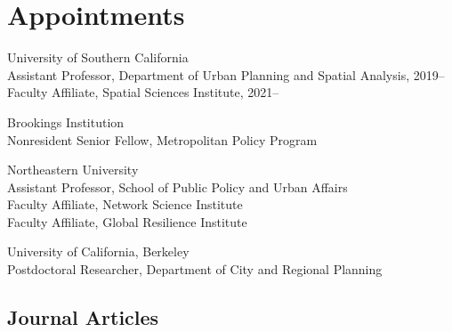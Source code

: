     \section*{Appointments}

    \begin{tablist}

        \item[2019--]   \tab{}University of Southern California \\
                              Assistant Professor, Department of Urban Planning and Spatial Analysis, 2019-- \\
                              Faculty Affiliate, Spatial Sciences Institute, 2021--

        \item[2021--]   \tab{}Brookings Institution \\
                              Nonresident Senior Fellow, Metropolitan Policy Program \\

        \item[2018--19] \tab{}Northeastern University \\
                              Assistant Professor, School of Public Policy and Urban Affairs \\
                              Faculty Affiliate, Network Science Institute \\
                              Faculty Affiliate, Global Resilience Institute

        \item[2017--18] \tab{}University of California, Berkeley \\
                              Postdoctoral Researcher, Department of City and Regional Planning

    \end{tablist}


 \subsection*{Journal Articles}

